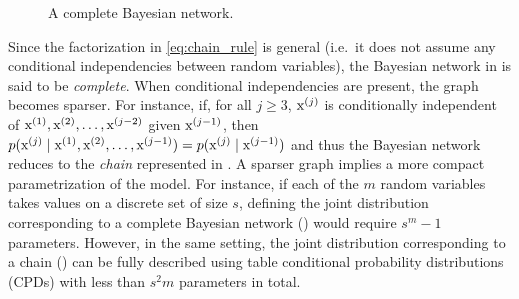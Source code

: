 \begin{figure}
    \centering
    \caption{A complete Bayesian network.}
    \label{fig:complete_bayesian_net}
\end{figure}

Since the factorization in \eqref{eq:chain_rule} is general (i.e.\ it does not assume any conditional independencies between random variables), the Bayesian network in  is said to be \emph{complete}. When conditional independencies are present, the graph becomes sparser. For instance, if, for all $j \geq 3$, ${\textnormal{x}}^{(j)}$ is conditionally independent of ${\textnormal{x}}^{(1)}, {\textnormal{x}}^{(2)}, \dots, {\textnormal{x}}^{(j-2)}$ given ${\textnormal{x}}^{(j-1)}$, then $p({\textnormal{x}}^{(j)} \mid {\textnormal{x}}^{(1)}, {\textnormal{x}}^{(2)}, \dots, {\textnormal{x}}^{(j-1)}) = p({\textnormal{x}}^{(j)} \mid {\textnormal{x}}^{(j-1)})$ and thus the Bayesian network reduces to the \emph{chain} represented in . A sparser graph implies a more compact parametrization of the model. For instance, if each of the $m$ random variables takes values on a discrete set of size $s$, defining the joint distribution corresponding to a complete Bayesian network () would require $s^{m}-1$ parameters. However, in the same setting, the joint distribution corresponding to a chain () can be fully described using table conditional probability distributions (CPDs) with less than $s^2m$ parameters in total.

